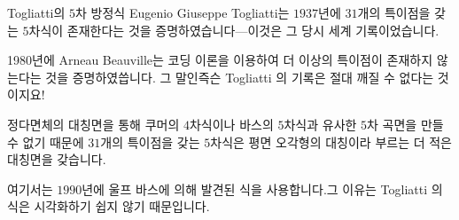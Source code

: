 \begin{surferPage}{Togliatti의 $5$차 방정식}
    Eugenio Giuseppe Togliatti는 $1937$년에 $31$개의 특이점을 갖는 $5$차식이 존재한다는 것을 증명하였습니다---이것은 그 당시 세계 기록이었습니다. 


    1980년에 Arneau Beauville는 코딩 이론을 이용하여 더 이상의 특이점이 존재하지 않는다는 것을 증명하였씁니다. 
    그 말인즉슨 Togliatti 의 기록은 절대 깨질 수 없다는 것이지요!

	정다면체의 대칭면을 통해 쿠머의 $4$차식이나 바스의 $5$차식과 유사한 $5$차 곡면을 만들 수 없기 때문에 $31$개의 특이점을 갖는 $5$차식은 평면 오각형의 대칭이라 부르는 더 적은 대칭면을 갖습니다.

여기서는 $1990$년에 울프 바스에 의해 발견된 식을 사용합니다.그 이유는 Togliatti 의 식은 시각화하기 쉽지 않기 때문입니다.
\end{surferPage}
